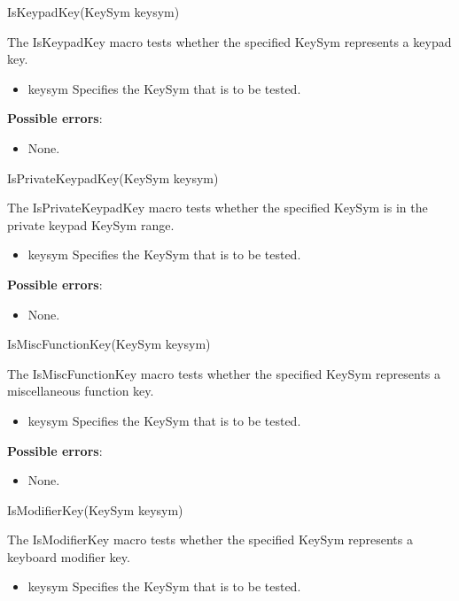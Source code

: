 \documentclass{report}
\begin{document}
\begin{itemize}
        \begin{cppcode}
        IsKeypadKey(KeySym keysym)
        \end{cppcode}
        \bigbreak \noindent
        The IsKeypadKey macro tests whether the specified KeySym represents a keypad key.
        \begin{itemize}
            \item keysym Specifies the KeySym that is to be tested.
        \end{itemize}

        \textbf{Possible errors}:
        \begin{itemize}
            \item None.
        \end{itemize}

        \begin{cppcode}
        IsPrivateKeypadKey(KeySym keysym)
        \end{cppcode}
        \bigbreak \noindent
        The IsPrivateKeypadKey macro tests whether the specified KeySym is in the private keypad KeySym range.
        \begin{itemize}
            \item keysym Specifies the KeySym that is to be tested.
        \end{itemize}

        \textbf{Possible errors}:
        \begin{itemize}
            \item None.
        \end{itemize}

        \begin{cppcode}
        IsMiscFunctionKey(KeySym keysym)
        \end{cppcode}
        \bigbreak \noindent
        The IsMiscFunctionKey macro tests whether the specified KeySym represents a miscellaneous function key.
        \begin{itemize}
            \item keysym Specifies the KeySym that is to be tested.
        \end{itemize}

        \textbf{Possible errors}:
        \begin{itemize}
            \item None.
        \end{itemize}

        \begin{cppcode}
        IsModifierKey(KeySym keysym)
        \end{cppcode}
        \bigbreak \noindent
        The IsModifierKey macro tests whether the specified KeySym represents a keyboard modifier key.
        \begin{itemize}
            \item keysym Specifies the KeySym that is to be tested.
        \end{itemize}


\end{itemize}
\end{document}
